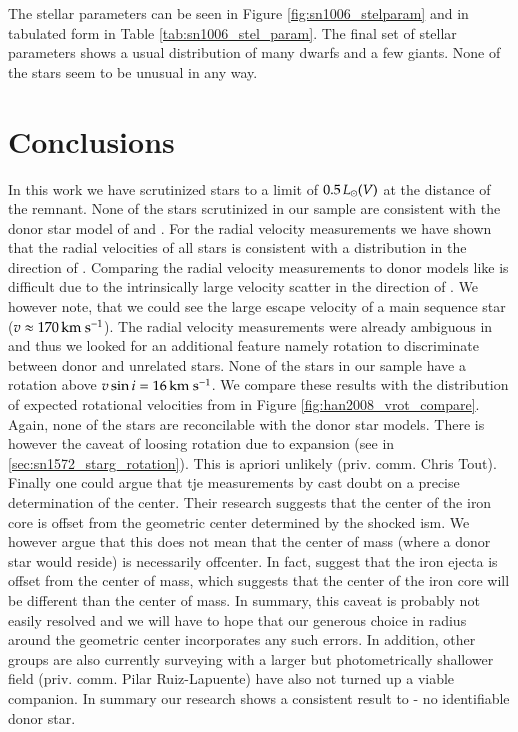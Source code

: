 The stellar parameters can be seen in Figure \ref{fig:sn1006_stelparam} and in tabulated form in Table \ref{tab:sn1006_stel_param}. The final set of stellar parameters shows a usual distribution of many dwarfs and a few giants. None of the stars seem to be unusual in any way. 


\section{Conclusions}
In this work we have scrutinized stars to a limit of $0.5\,\hbox{$L_{\odot}$}(V)$ at the distance of the remnant. None of the stars scrutinized in our sample are consistent with the donor star model of \citet{2000ApJS..128..615M} and \citet{2008A&A...489..943P}. For the radial velocity measurements we have shown that the radial velocities of all stars is consistent with a distribution in the direction of . Comparing the radial velocity measurements to donor models like \citep[see Figure \ref{fig:han2008_vrad}][]{2008ApJ...677L.109H} is difficult due to the intrinsically large velocity scatter in the direction of . We however note, that we could see the large escape velocity of a main sequence star ($v\approx170\,\hbox{km s$^{-1}$}$). The radial velocity measurements were already ambiguous in  and thus we looked for an additional feature namely rotation to discriminate between donor and unrelated stars. None of the stars in our sample have a rotation above $v\sin{i}=16\,\hbox{km s$^{-1}$}$. We compare these results with the distribution of expected rotational velocities from \citet{2008ApJ...677L.109H} in Figure \ref{fig:han2008_vrot_compare}. Again, none of the stars are reconcilable with the donor star models. There is however the caveat of loosing rotation due to expansion (see in \ref{sec:sn1572_starg_rotation}). This is apriori unlikely (priv. comm. Chris Tout). Finally one could argue that tje measurements by \citet[see Figure \ref{fig:sn1006_uvprobe}]{2005ApJ...624..189W} cast doubt on a precise determination of the center. Their research suggests that the center of the iron core is offset from the geometric center determined by the shocked \gls{ism}. We however argue that this does not mean that the center of mass (where a donor star would reside) is necessarily offcenter. In fact, \cite{2010ApJ...708.1703M} suggest that the iron ejecta is offset from the center of mass, which suggests that the center of the iron core will be different than the center of mass. In summary, this caveat is probably not easily resolved and we will have to hope that our generous choice in radius around the geometric center incorporates any such errors. In addition, other groups are also currently surveying  with a larger but photometrically shallower field (priv. comm. Pilar Ruiz-Lapuente) have also not turned up a viable companion. In summary our research shows a consistent result to  - no identifiable donor star.

